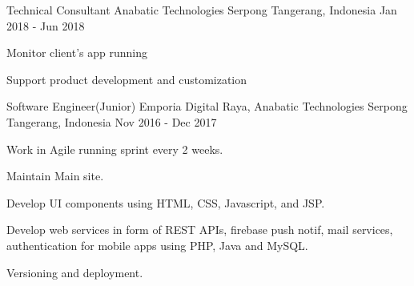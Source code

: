 \begin{cventries}
\cventry
    {Technical Consultant}
    {Anabatic Technologies}
    {Serpong Tangerang, Indonesia}
    {Jan 2018 - Jun 2018}
    {
        \begin{cvitems}
            \item {Monitor client's app running}
            \item {Support product development and customization}
        \end{cvitems}
    }

\cventry
    {Software Engineer(Junior)}
    {Emporia Digital Raya, Anabatic Technologies}
    {Serpong Tangerang, Indonesia}
    {Nov 2016 - Dec 2017}
    {
        \begin{cvitems}
            \item {Work in Agile running sprint every 2 weeks.}
            \item {Maintain Main site.}
            \item {Develop UI components using HTML, CSS, Javascript, and JSP.}
            \item {Develop web services in form of REST APIs, firebase push notif, mail services, authentication for mobile apps using PHP, Java and MySQL.}
            \item {Versioning and deployment.}
        \end{cvitems}
    }

\iffalse
\cventry
    {Internship}
    {Chevron Pacific Indonesia}
    {Duri Riau, Indonesia}
    {2015}
    {
        \begin{cvitems}
            \item {Internship under UTC-POD Team in IT Departement.}
            \item {Create simple web app using C\# ASP.Net to handle request for well surveys.}
        \end{cvitems}
    }
\fi

\end{cventries}
